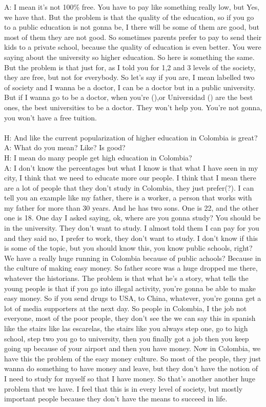 \documentclass{phyasgn}\usepackage{nag}
\begin{document}
A: I mean it's not 100\% free. You have to pay like something really low, but Yes, we have that. But the problem is that the quality of the education, so if you go to a public education is not gonna be, I there will be some of them are good, but most of them they are not good. So sometimes parents prefer to pay to send their kids to a private school, because the quality of education is even better. You were saying about the university so higher education. So here is something the same. But the problem is that just for, as I told you for 1,2 and 3 levels of the society, they are free, but not for everybody. So let's say if you are, I mean labelled two of society and I wanna be a doctor, I can be a doctor but in a public university. But if I wanna go to be a doctor, when you're (),or Universidad () are the best ones, the best universities to be a doctor. They won't help you. You're not gonna, you won't have a free tuition.\\
\\
H: And like the current popularization of higher education in Colombia is great?\\
A: What do you mean? Like? Is good?\\
H: I mean do many people get high education in Colombia?\\
A: I don't know the percentages but what I know is that what I have seen in my city, I think that we need to educate more our people. I think that I mean there are a lot of people that they don't study in Colombia, they just prefer(?). I can tell you an example like my father, there is a worker, a person that works with my father for more than 30 years. And he has two sons. One is 22, and the other one is 18. One day I asked saying, ok, where are you gonna study? You should be in the university. They don't want to study. I almost told them I can pay for you and they said no, I prefer to work, they don't want to study. I don't know if this is some of the topic, but you should know this, you know public schools, right? We have a really huge running in Colombia because of public achools? Because in the culture of making easy money. So father score was a huge dropped me there, whatever the historians. The problem is that what he's a story, what tells the young people is that if you go into illegal activity, you're gonna be able to make easy money. So if you send drugs to USA, to China, whatever, you're gonna get a lot of media supporters at the next day. So people in Colombia, I the job not everyone, most of the poor people, they don't see the we can say this in spanish like the stairs like las escarelas, the stairs like you always step one, go to high school, step two you go to university, then you finally got a job then you keep going up because of your airport and then you have money. Now in Colombia, we have this the problem of the easy money culture. So most of the people, they just wanna do something to have money and leave, but they don't have the notion of I need to study for myself so that I have money. So that's another another huge problem that we have. I feel that this is in every level of society, but mostly important people because they don't have the means to succeed in life.\\ 
\end{document}
